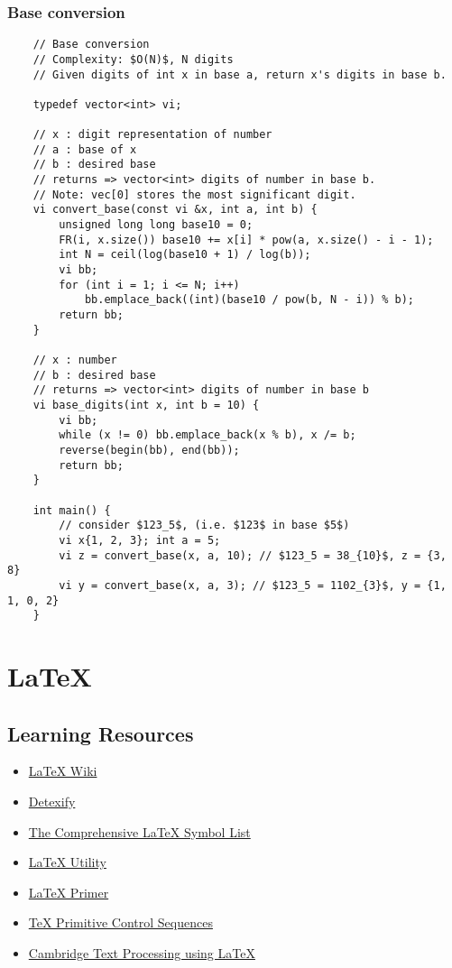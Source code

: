 \documentclass{article}
\begin{document}
\subsubsection{Base conversion}
\begin{verbatim}
    // Base conversion
    // Complexity: $O(N)$, N digits
    // Given digits of int x in base a, return x's digits in base b.
    
    typedef vector<int> vi;

    // x : digit representation of number
    // a : base of x
    // b : desired base
    // returns => vector<int> digits of number in base b.
    // Note: vec[0] stores the most significant digit.
    vi convert_base(const vi &x, int a, int b) {
        unsigned long long base10 = 0;
        FR(i, x.size()) base10 += x[i] * pow(a, x.size() - i - 1);
        int N = ceil(log(base10 + 1) / log(b));
        vi bb;
        for (int i = 1; i <= N; i++)
            bb.emplace_back((int)(base10 / pow(b, N - i)) % b);
        return bb;
    }

    // x : number
    // b : desired base
    // returns => vector<int> digits of number in base b
    vi base_digits(int x, int b = 10) {
        vi bb;
        while (x != 0) bb.emplace_back(x % b), x /= b;
        reverse(begin(bb), end(bb));
        return bb;
    }

    int main() {
        // consider $123_5$, (i.e. $123$ in base $5$)
        vi x{1, 2, 3}; int a = 5;
        vi z = convert_base(x, a, 10); // $123_5 = 38_{10}$, z = {3, 8}
        vi y = convert_base(x, a, 3); // $123_5 = 1102_{3}$, y = {1, 1, 0, 2}
    }
\end{verbatim}

\section{\LaTeX}

\subsection{Learning Resources}
\begin{itemize}
    \item \href{https://en.wikibooks.org/wiki/LaTeX}{LaTeX Wiki}
    \item \href{http://detexify.kirelabs.org/classify.html}{Detexify}
    \item \href{Uhttps://www.ctan.org/tex-archive/info/symbols/comprehensiveRL}{The Comprehensive LaTeX Symbol List}
    \item \href{http://mathlex.org/latex}{LaTeX Utility}
    \item \href{https://www.maths.tcd.ie/~dwilkins/LaTeXPrimer/}{LaTeX Primer}
    \item \href{https://www.tug.org/utilities/plain/cseq.html}{TeX Primitive Control Sequences}
    \item \href{http://www-h.eng.cam.ac.uk/help/tpl/textprocessing/}{Cambridge Text Processing using LaTeX}
\end{itemize}
\end{document}
